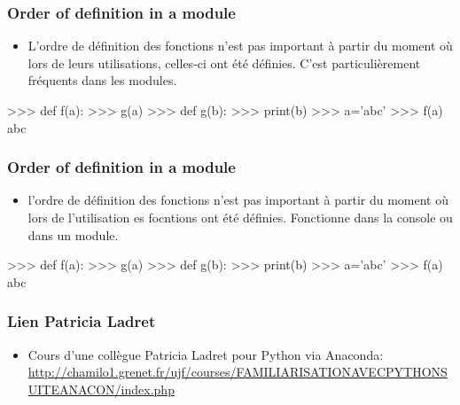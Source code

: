 \begin{frame}[fragile]
\frametitle{Order of definition in a module}
\begin{itemize}
 \item L'ordre de définition des fonctions n'est pas important à partir du moment où lors de leurs utilisations, celles-ci ont été définies. 
 C'est particulièrement fréquents dans les modules. 
\end{itemize}
\begin{pythonConsole}
>>> def f(a): 
>>>     g(a)
>>> def g(b): 
>>>     print(b)
>>> a='abc'
>>> f(a)
abc
\end{pythonConsole}
\end{frame}

\begin{frame}[fragile]
\frametitle{Order of definition in a module}
\begin{itemize}
 \item l'ordre de définition des fonctions n'est pas important à partir du moment où lors de l'utilisation es focntions ont été définies. 
 Fonctionne dans la console ou dans un module. 
\end{itemize}
\begin{pythonConsole}
>>> def f(a): 
>>>     g(a)
>>> def g(b): 
>>>     print(b)
>>> a='abc'
>>> f(a)
abc
\end{pythonConsole}
\end{frame}
\begin{frame}
\frametitle{Lien Patricia Ladret}
\begin{itemize}
 \item Cours d'une collègue Patricia Ladret pour Python via Anaconda: 
 \url{http://chamilo1.grenet.fr/ujf/courses/FAMILIARISATIONAVECPYTHONSUITEANACON/index.php}
\end{itemize}
\end{frame}
